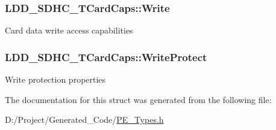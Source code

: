 \subsubsection[{Write}]{ L\+D\+D\+\_\+\+S\+D\+H\+C\+\_\+\+T\+Card\+Caps\+::\+Write}\label{struct_l_d_d___s_d_h_c___t_card_caps_ad28c378a6b9edfbd726a8019d5c8be79}
Card data write access capabilities \hypertarget{struct_l_d_d___s_d_h_c___t_card_caps_a32ecbbace3b435b1d70a57b09bf9662b}{}
\subsubsection[{Write\+Protect}]{ L\+D\+D\+\_\+\+S\+D\+H\+C\+\_\+\+T\+Card\+Caps\+::\+Write\+Protect}\label{struct_l_d_d___s_d_h_c___t_card_caps_a32ecbbace3b435b1d70a57b09bf9662b}
Write protection properties 

The documentation for this struct was generated from the following file\+:\begin{DoxyCompactItemize}
\item 
D\+:/\+Project/\+Generated\+\_\+\+Code/\hyperlink{_p_e___types_8h}{P\+E\+\_\+\+Types.\+h}\end{DoxyCompactItemize}

